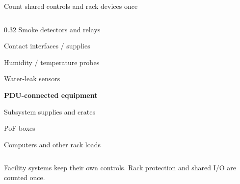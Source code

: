 \begin{frame}{Count shared controls and rack devices once}
\begin{columns}[T,onlytextwidth]
\begin{column}{0.32\textwidth}
\hspace*{0.8em}Smoke detectors and relays\par
\hspace*{0.8em}Contact interfaces / supplies\par
\hspace*{0.8em}Humidity / temperature probes\par
\hspace*{0.8em}Water-leak sensors\par\bigskip
\textbf{PDU-connected equipment}\par
\hspace*{0.8em}Subsystem supplies and crates\par
\hspace*{0.8em}PoF boxes\par
\hspace*{0.8em}Computers and other rack loads
\end{column}
\end{columns}\par\bigskip
Facility systems keep their own controls. Rack protection and shared I/O are counted once.
\end{frame}

